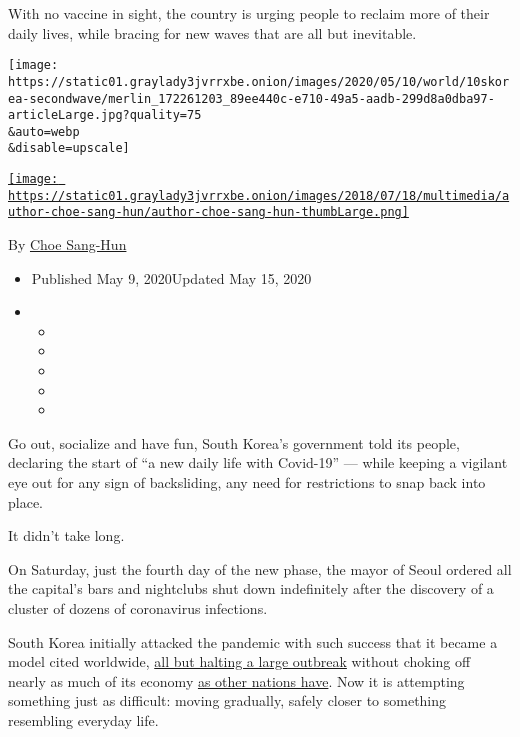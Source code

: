 With no vaccine in sight, the country is urging people to reclaim more
of their daily lives, while bracing for new waves that are all but
inevitable.

\texttt{[image: https://static01.graylady3jvrrxbe.onion/images/2020/05/10/world/10skorea-secondwave/merlin\_172261203\_89ee440c-e710-49a5-aadb-299d8a0dba97-articleLarge.jpg?quality=75\\\&auto=webp\\\&disable=upscale]}

\href{https://www.nytimes3xbfgragh.onion/by/choe-sang-hun}{\texttt{[image: https://static01.graylady3jvrrxbe.onion/images/2018/07/18/multimedia/author-choe-sang-hun/author-choe-sang-hun-thumbLarge.png]}}

By \href{https://www.nytimes3xbfgragh.onion/by/choe-sang-hun}{Choe
Sang-Hun}

\begin{itemize}
\item
  Published May 9, 2020Updated May 15, 2020
\item
  \begin{itemize}
  \item
  \item
  \item
  \item
  \item
  \end{itemize}
\end{itemize}

Go out, socialize and have fun, South Korea's government told its
people, declaring the start of ``a new daily life with Covid-19'' ---
while keeping a vigilant eye out for any sign of backsliding, any need
for restrictions to snap back into place.

It didn't take long.

On Saturday, just the fourth day of the new phase, the mayor of Seoul
ordered all the capital's bars and nightclubs shut down indefinitely
after the discovery of a cluster of dozens of coronavirus infections.

South Korea initially attacked the pandemic with such success that it
became a model cited worldwide,
\href{https://www.nytimes3xbfgragh.onion/2020/03/23/world/asia/coronavirus-south-korea-flatten-curve.html}{all
but halting a large outbreak} without choking off nearly as much of its
economy
\href{https://www.nytimes3xbfgragh.onion/2020/04/29/business/economy/us-gdp.html}{as
other nations have}. Now it is attempting something just as difficult:
moving gradually, safely closer to something resembling everyday life.

